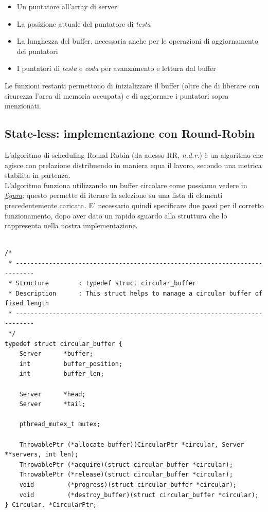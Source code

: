 \documentclass[italian]{tktltiki2}
\begin{document}
	\begin{itemize}
  		\item Un puntatore all'array di server 
  		\item La posizione attuale del puntatore di \emph{testa} 
  		\item La lunghezza del buffer, necessaria anche per le operazioni di aggiornamento dei puntatori
  		\item I puntatori di \emph{testa} e \emph{coda} per avanzamento e lettura dal buffer
	\end{itemize}
	Le funzioni restanti permettono di inizializzare il buffer (oltre che di liberare con sicurezza l'area di memoria occupata) e di aggiornare i puntatori sopra menzionati.\\

\subsection{State-less: implementazione con Round-Robin}
L'algoritmo di scheduling Round-Robin (da adesso RR, \emph{n.d.r.}) è un algoritmo che agisce con prelazione distribuendo in maniera equa il lavoro, secondo una metrica stabilita in partenza.
\\
L'algoritmo funziona utilizzando un buffer circolare come possiamo vedere in \hyperref[fig: rrobin_sl]{\emph{figura}}: questo permette di iterare la selezione su una lista di elementi precedentemente caricata. E' necessario quindi specificare due passi per il corretto funzionamento, dopo aver dato un rapido sguardo alla struttura che lo rappresenta nella nostra implementazione.
\\
\\
\begin{lstlisting}
/*
 * ---------------------------------------------------------------------------
 * Structure        : typedef struct circular_buffer
 * Description      : This struct helps to manage a circular buffer of fixed length
 * ---------------------------------------------------------------------------
 */
typedef struct circular_buffer {
    Server      *buffer;
    int         buffer_position;
    int         buffer_len;
    
    Server      *head;
    Server      *tail;

    pthread_mutex_t mutex;

    ThrowablePtr (*allocate_buffer)(CircularPtr *circular, Server **servers, int len);
    ThrowablePtr (*acquire)(struct circular_buffer *circular);
    ThrowablePtr (*release)(struct circular_buffer *circular);
    void         (*progress)(struct circular_buffer *circular);
    void         (*destroy_buffer)(struct circular_buffer *circular);
} Circular, *CircularPtr;

\end{lstlisting}
\end{document}
